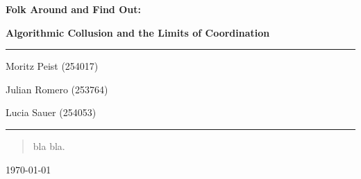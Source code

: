 \documentclass[12pt]{article}
\begin{document}
\begin{titlepage}
	\centering
	\par\vspace{1cm}
	{\huge\bfseries Folk Around and Find Out:\par}
    {\large\bfseries Algorithmic Collusion and the Limits of Coordination\par}
	\vspace{1cm}
    \noindent\rule{\textwidth}{1pt}
    {\Large Moritz Peist (254017)\par}
    {\Large Julian Romero (253764)\par}
    {\Large Lucia Sauer (254053)\par}
    \noindent\rule{\textwidth}{1pt}
    \vfill
    \begin{abstract}
        \noindent
        bla bla.
    \end{abstract}
	\vfill
	{\large \today\par}
\end{titlepage}

\tableofcontents
\thispagestyle{empty}

\newpage
\addtocounter{page}{-1}



\newpage

\newpage

\newpage


\newpage
\printbibliography[heading=bibintoc,title={References}]

\newpage

\end{document}

